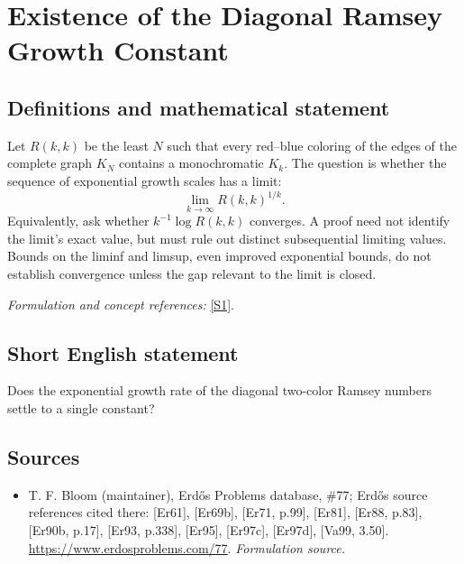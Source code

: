 \documentclass[11pt]{article}
\begin{document}
\section*{\texorpdfstring{Existence of the Diagonal Ramsey Growth Constant}{Existence of the Diagonal Ramsey Growth Constant}}\label{469}
\subsection{Definitions and mathematical statement}
Let $R(k,k)$ be the least $N$ such that every red--blue coloring of the edges of the complete graph $K_N$ contains a monochromatic $K_k$. The question is whether the sequence of exponential growth scales has a limit:
\[
 \lim_{k\to\infty}R(k,k)^{1/k}.
\]
Equivalently, ask whether $k^{-1}\log R(k,k)$ converges. A proof need not identify the limit's exact value, but must rule out distinct subsequential limiting values. Bounds on the liminf and limsup, even improved exponential bounds, do not establish convergence unless the gap relevant to the limit is closed.
\par\smallskip\textit{Formulation and concept references:} \href{https://www.erdosproblems.com/77}{[S1]}.

\subsection{Short English statement}
Does the exponential growth rate of the diagonal two-color Ramsey numbers settle to a single constant?
\subsection{Sources}
\begin{itemize}
\item[S1]T. F. Bloom (maintainer), Erdős Problems database, \#77; Erdős source references cited there: [Er61], [Er69b], [Er71, p.99], [Er81], [Er88, p.83], [Er90b, p.17], [Er93, p.338], [Er95], [Er97c], [Er97d], [Va99, 3.50].
\url{https://www.erdosproblems.com/77}.
\textit{Formulation source.}
\end{itemize}
\end{document}
